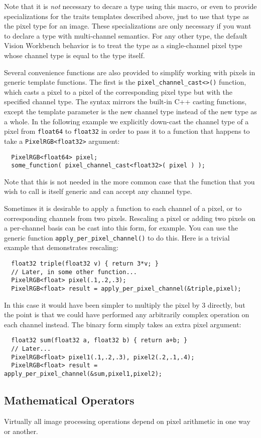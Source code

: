 Note that it is {\it not} necessary to decare a type using this macro,
or even to provide specializations for the traits templates described
above, just to use that type as the pixel type for an image.  These
specializations are only necessary if you want to declare a type with
multi-channel semantics.  For any other type, the default Vision
Workbench behavior is to treat the type as a single-channel pixel type
whose channel type is equal to the type itself.

Several convenience functions are also provided to simplify working
with pixels in generic template functions.  The first is the
\verb#pixel_channel_cast<>()# function, which casts a pixel to a pixel
of the corresponding pixel type but with the specified channel type.
The syntax mirrors the built-in C++ casting functions, except the
template parameter is the new channel type instead of the new type as
a whole.  In the following example we explicitly down-cast the channel
type of a pixel from \verb#float64# to \verb#float32# in order to pass
it to a function that happens to take a \verb#PixelRGB<float32>#
argument:
\begin{verbatim}
  PixelRGB<float64> pixel;
  some_function( pixel_channel_cast<float32>( pixel ) );
\end{verbatim}
Note that this is not needed in the more common case that the 
function that you wish to call is itself generic and can accept 
any channel type.

Sometimes it is desirable to apply a function to each channel
of a pixel, or to corresponding channels from two pixels.  Rescaling a
pixel or adding two pixels on a per-channel basis can be cast into
this form, for example.  You can use the generic function
\verb#apply_per_pixel_channel()# to do this.  Here is a trivial 
example that demonstrates rescaling:
\begin{verbatim}
  float32 triple(float32 v) { return 3*v; }
  // Later, in some other function...
  PixelRGB<float> pixel(.1,.2,.3);
  PixelRGB<float> result = apply_per_pixel_channel(&triple,pixel);
\end{verbatim}
In this case it would have been simpler to multiply the pixel 
by $3$ directly, but the point is that we could have performed 
any arbitrarily complex operation on each channel instead.
The binary form simply takes an extra pixel argument:
\begin{verbatim}
  float32 sum(float32 a, float32 b) { return a+b; }
  // Later...
  PixelRGB<float> pixel1(.1,.2,.3), pixel2(.2,.1,.4);
  PixelRGB<float> result = apply_per_pixel_channel(&sum,pixel1,pixel2);
\end{verbatim}

\subsection{Mathematical Operators}
Virtually all image processing operations depend on pixel 
arithmetic in one way or another.
